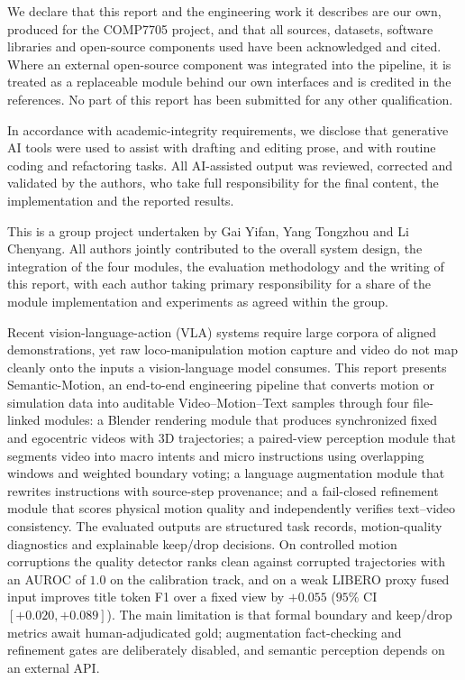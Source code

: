 \documentclass[11pt,oneside]{report}
\begin{document}
\makeprojecttitle
\frontmatterstyle

\begin{declaration}
\noindent We declare that this report and the engineering work it describes are
our own, produced for the COMP7705 project, and that all sources, datasets,
software libraries and open-source components used have been acknowledged and
cited. Where an external open-source component was integrated into the pipeline,
it is treated as a replaceable module behind our own interfaces and is credited
in the references. No part of this report has been submitted for any other
qualification.

\noindent In accordance with academic-integrity requirements, we disclose that
generative AI tools were used to assist with drafting and editing prose, and with
routine coding and refactoring tasks. All AI-assisted output was reviewed,
corrected and validated by the authors, who take full responsibility for the
final content, the implementation and the reported results.

\noindent This is a group project undertaken by Gai Yifan, Yang Tongzhou and Li
Chenyang. All authors jointly contributed to the overall system design, the
integration of the four modules, the evaluation methodology and the writing of
this report, with each author taking primary responsibility for a share of the
module implementation and experiments as agreed within the group.
\end{declaration}

\begin{projectabstract}
Recent vision-language-action (VLA) systems require large corpora of aligned
demonstrations, yet raw loco-manipulation motion capture and video do not map
cleanly onto the inputs a vision-language model consumes. This report presents
Semantic-Motion, an end-to-end engineering pipeline that converts motion or
simulation data into auditable Video--Motion--Text samples through four
file-linked modules: a Blender rendering module that produces synchronized fixed
and egocentric videos with 3D trajectories; a paired-view perception module that
segments video into macro intents and micro instructions using overlapping
windows and weighted boundary voting; a language augmentation module that
rewrites instructions with source-step provenance; and a fail-closed refinement
module that scores physical motion quality and independently verifies
text--video consistency. The evaluated outputs are structured task records,
motion-quality diagnostics and explainable keep/drop decisions. On controlled
motion corruptions the quality detector ranks clean against corrupted
trajectories with an AUROC of $1.0$ on the calibration track, and on a weak
LIBERO proxy fused input improves title token F1 over a fixed view by $+0.055$
($95\%$ CI $[+0.020, +0.089]$). The main limitation is that formal boundary and
keep/drop metrics await human-adjudicated gold; augmentation fact-checking and
refinement gates are deliberately disabled, and semantic perception depends on an
external API.
\end{projectabstract}
\end{document}
